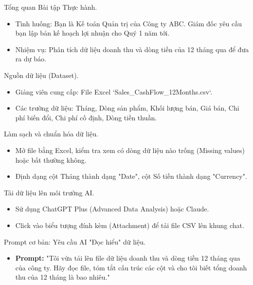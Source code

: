 \documentclass[aspectratio=169]{beamer}
\begin{document}
\begin{frame}{Tổng quan Bài tập Thực hành.}
    \begin{itemize}
        \item Tình huống: Bạn là Kế toán Quản trị của Công ty ABC. Giám đốc yêu cầu bạn lập bản kế hoạch lợi nhuận cho Quý 1 năm tới.
        \item Nhiệm vụ: Phân tích dữ liệu doanh thu và dòng tiền của 12 tháng qua để đưa ra dự báo.
    \end{itemize}
\end{frame}


\begin{frame}{Nguồn dữ liệu (Dataset).}
    \begin{itemize}
        \item Giảng viên cung cấp: File Excel `Sales\_CashFlow\_12Months.csv`.
        \item Các trường dữ liệu: Tháng, Dòng sản phẩm, Khối lượng bán, Giá bán, Chi phí biến đổi, Chi phí cố định, Dòng tiền thuần.
    \end{itemize}
\end{frame}


\begin{frame}{Làm sạch và chuẩn hóa dữ liệu.}
    \begin{itemize}
        \item Mở file bằng Excel, kiểm tra xem có dòng dữ liệu nào trống (Missing values) hoặc bất thường không.
        \item Định dạng cột Tháng thành dạng "Date", cột Số tiền thành dạng "Currency".
    \end{itemize}
\end{frame}


\begin{frame}{Tải dữ liệu lên môi trường AI.}
    \begin{itemize}
        \item Sử dụng ChatGPT Plus (Advanced Data Analysis) hoặc Claude.
        \item Click vào biểu tượng đính kèm (Attachment) để tải file CSV lên khung chat.
    \end{itemize}
\end{frame}


\begin{frame}{Prompt cơ bản: Yêu cầu AI "Đọc hiểu" dữ liệu.}
    \begin{itemize}
        \item \textbf{Prompt:} "Tôi vừa tải lên file dữ liệu doanh thu và dòng tiền 12 tháng qua của công ty. Hãy đọc file, tóm tắt cấu trúc các cột và cho tôi biết tổng doanh thu của 12 tháng là bao nhiêu."
    \end{itemize}
\end{frame}
\end{document}
